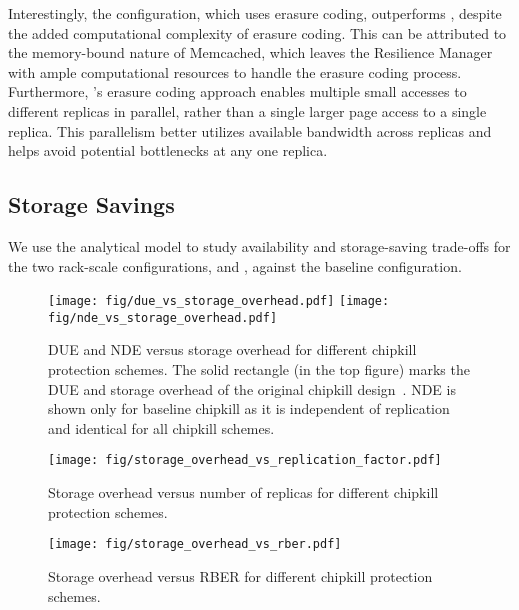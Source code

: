 Interestingly, the \chipkillec configuration, which uses erasure coding, outperforms \chipkillrep, despite the added computational complexity of erasure coding. This can be attributed to the memory-bound nature of Memcached, which leaves the Resilience Manager with ample computational resources to handle the erasure coding process. Furthermore, \chipkillec’s erasure coding approach enables multiple small accesses to different replicas in parallel, rather than a single larger page access to a single replica. This parallelism better utilizes available bandwidth across replicas and helps avoid potential bottlenecks at any one replica.

\subsection{Storage Savings}
We use the analytical model to study availability and storage-saving trade-offs for the two rack-scale configurations, \chipkillrep and \chipkillec, against the baseline \chipkill configuration.


\begin{figure}[tb]
\centering
\texttt{[image: fig/due\_vs\_storage\_overhead.pdf]}
\texttt{[image: fig/nde\_vs\_storage\_overhead.pdf]}
\caption{DUE and NDE versus storage overhead for different chipkill protection schemes.
The solid rectangle (in the top figure) marks the DUE and storage overhead of the original chipkill design~\cite{zhang:pm-chipkill:micro:2018}.
NDE is shown only for baseline chipkill as it is independent of replication and identical for all chipkill schemes.
}
\label{fig:storage-overhead-due}
\end{figure}

\begin{figure}[tb]
\centering
\texttt{[image: fig/storage\_overhead\_vs\_replication\_factor.pdf]}
\caption{Storage overhead versus number of replicas for different chipkill protection schemes.
}
\label{fig:storage-overhead-replicas}
\end{figure}

\begin{figure}[tb]
\centering
\texttt{[image: fig/storage\_overhead\_vs\_rber.pdf]}
\caption{Storage overhead versus RBER for different chipkill protection schemes.
}
\label{fig:storage-overhead-rber}
\end{figure}

